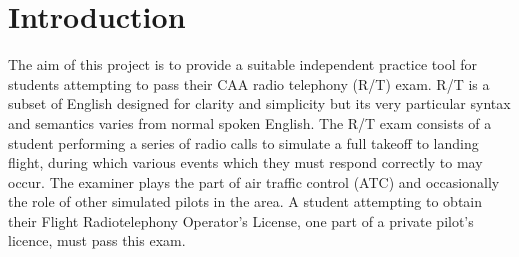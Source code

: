 \section{Introduction}

The aim of this project is to provide a suitable independent practice tool for students attempting to pass their CAA radio telephony (R/T) exam. R/T is a subset of English designed for clarity and simplicity but its very particular syntax and semantics varies from normal spoken English.
The R/T exam consists of a student performing a series of radio calls to simulate a full takeoff to landing flight, during which various events which they must respond correctly to may occur.
The examiner plays the part of air traffic control (ATC) and occasionally the role of other simulated pilots in the area.
A student attempting to obtain their Flight Radiotelephony Operator's License, one part of a private pilot's licence, must pass this exam.